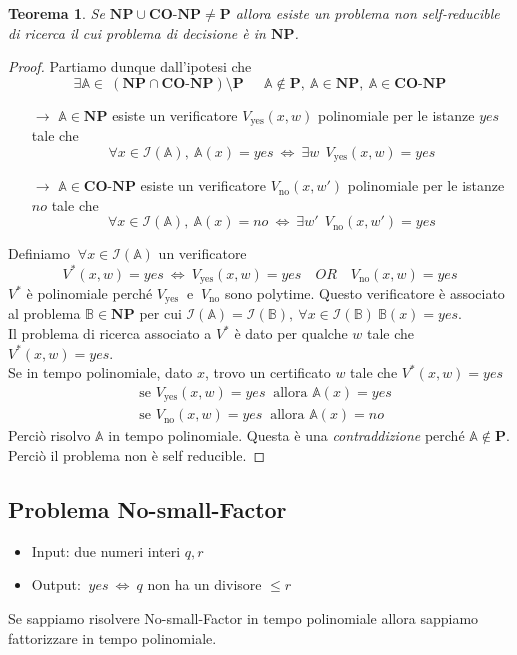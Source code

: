 \documentclass[a4paper]{article}
\newtheorem{thm}{Teorema}[subsection]
\theoremstyle{definition}
\newcommand{\p}{\mathbf{P}}
\newcommand{\np}{\mathbf{NP}}
\newcommand{\conp}{\mathbf{CO}\text{-}\mathbf{NP}}
\newcommand{\prob}[1]{\mathbb{#1}}
\newcommand{\instance}[1]{\mathcal{I}(\prob{#1})}
\begin{document}
		\begin{thm}
			Se $ \np\cup\conp \neq \p $ allora esiste un problema non self-reducible di ricerca il cui problema di decisione è in $ \np $.
		\end{thm}
		
		\begin{proof}
			Partiamo dunque dall'ipotesi che
			\[
				\exists \prob{A}\in\ (\np \cap \conp)\setminus \p\ \quad\ \prob{A}\notin\p,\ \prob{A}\in\np,\ \prob{A}\in\conp
			\]
			\begin{itemize}
				\item[$ \rightarrow $] $ \prob{A}\in\np $ esiste un verificatore $ V_{\text{yes}}(x, w) $ polinomiale per le istanze $ yes $ tale che 
				\[
					\forall x \in \instance{A},\ \prob{A}(x) = yes\ \Leftrightarrow\ \exists w\ \ V_{\text{yes}}(x, w) = yes
				\] 
				\item[$ \rightarrow $] $ \prob{A}\in\conp $ esiste un verificatore $ V_{\text{no}}(x, w') $ polinomiale per le istanze $ no $ tale che 
				\[
					\forall x \in \instance{A},\ \prob{A}(x) = no\ \Leftrightarrow\ \exists w'\ \ V_{\text{no}}(x, w') = yes
				\] 
			\end{itemize}
			Definiamo $ \ \forall x \in \instance{A} $ un verificatore 
			\[
				V^*(x, w) = yes \ \Leftrightarrow\ V_{\text{yes}}(x, w) = yes\quad OR\quad V_{\text{no}}(x, w) = yes
			\]
			$ V^* $ è polinomiale perché $ V_{\text{yes}}\ $ e $\ V_{\text{no}} $ sono polytime. Questo verificatore è associato al problema $ \prob{B}\in \np $ per cui $ \instance{A} = \instance{B},\ \forall x \in \instance{B}\ \prob{B}(x) = yes $.\\
			
			Il problema di ricerca associato a $ V^* $ è dato per qualche $ w $ tale che $ V^*(x, w) = yes $.\\
			
			Se in tempo polinomiale, dato $ x $, trovo un certificato $ w $ tale che  $ V^*(x, w) = yes $
			\begin{align*}
				&\text{se } V_{\text{yes}}(x, w) = yes\ \text{ allora } \prob{A}(x) = yes \\
				&\text{se } V_{\text{no}}(x, w) = yes\ \text{ allora } \prob{A}(x) = no
			\end{align*}
			Perciò risolvo $ \prob{A} $ in tempo polinomiale. Questa è una \textit{contraddizione} perché $ \prob{A}\notin \p $. Perciò il problema non è self reducible.
		\end{proof}
		
	\subsection{Problema No-small-Factor}
		\begin{itemize}
			\item Input: due numeri interi $ q, r $
			\item Output: $\ yes\ \Leftrightarrow\ q $ non ha un divisore $ \leq r $
		\end{itemize}
		Se sappiamo risolvere No-small-Factor in tempo polinomiale allora sappiamo fattorizzare in tempo polinomiale.\\
		
\end{document}
